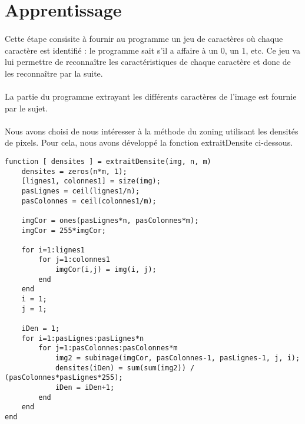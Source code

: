 \section{Apprentissage}

\paragraph{}
Cette étape consisite à fournir au programme un jeu de caractères où chaque caractère est identifié : le programme sait s'il a affaire à un 0, un 1, etc. 
Ce jeu va lui permettre de reconnaître les caractéristiques de chaque caractère et donc de les reconnaître par la suite. 

\paragraph{}
La partie du programme extrayant les différents caractères de l'image est fournie par le sujet. 

\paragraph{}
Nous avons choisi de nous intéresser à la méthode du zoning utilisant les densités de pixels. Pour cela, nous avons développé la fonction extraitDensite 
ci-dessous.

\begin{lstlisting}
function [ densites ] = extraitDensite(img, n, m)
    densites = zeros(n*m, 1);
    [lignes1, colonnes1] = size(img);
    pasLignes = ceil(lignes1/n);
    pasColonnes = ceil(colonnes1/m);
    
    imgCor = ones(pasLignes*n, pasColonnes*m);
    imgCor = 255*imgCor;
    
    for i=1:lignes1
        for j=1:colonnes1
            imgCor(i,j) = img(i, j);
        end
    end
    i = 1;
    j = 1;
    
    iDen = 1;
    for i=1:pasLignes:pasLignes*n
        for j=1:pasColonnes:pasColonnes*m
            img2 = subimage(imgCor, pasColonnes-1, pasLignes-1, j, i);
            densites(iDen) = sum(sum(img2)) / (pasColonnes*pasLignes*255);
            iDen = iDen+1;
        end
    end
end
\end{lstlisting}
